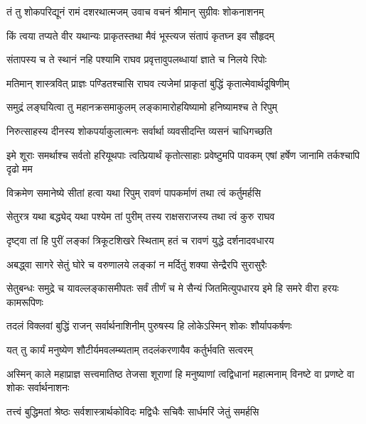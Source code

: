 
\twolineshloka
{तं तु शोकपरिद्यूनं रामं दशरथात्मजम्}
{उवाच वचनं श्रीमान् सुग्रीवः शोकनाशनम्} %

\twolineshloka
{किं त्वया तप्यते वीर यथान्यः प्राकृतस्तथा}
{मैवं भूस्त्यज संतापं कृतघ्न इव सौहृदम्} %

\twolineshloka
{संतापस्य च ते स्थानं नहि पश्यामि राघव}
{प्रवृत्तावुपलब्धायां ज्ञाते च निलये रिपोः} %

\twolineshloka
{मतिमान् शास्त्रवित् प्राज्ञः पण्डितश्चासि राघव}
{त्यजेमां प्राकृतां बुद्धिं कृतात्मेवार्थदूषिणीम्} %

\twolineshloka
{समुद्रं लङ्घयित्वा तु महानक्रसमाकुलम्}
{लङ्कामारोहयिष्यामो हनिष्यामश्च ते रिपुम्} %

\twolineshloka
{निरुत्साहस्य दीनस्य शोकपर्याकुलात्मनः}
{सर्वार्था व्यवसीदन्ति व्यसनं चाधिगच्छति} %

\threelineshloka
{इमे शूराः समर्थाश्च सर्वतो हरियूथपाः}
{त्वत्प्रियार्थं कृतोत्साहाः प्रवेष्टुमपि पावकम्}
{एषां हर्षेण जानामि तर्कश्चापि दृढो मम} %

\twolineshloka
{विक्रमेण समानेष्ये सीतां हत्वा यथा रिपुम्}
{रावणं पापकर्माणं तथा त्वं कर्तुमर्हसि} %

\twolineshloka
{सेतुरत्र यथा बद्ध्येद् यथा पश्येम तां पुरीम्}
{तस्य राक्षसराजस्य तथा त्वं कुरु राघव} %

\twolineshloka
{दृष्ट्वा तां हि पुरीं लङ्कां त्रिकूटशिखरे स्थिताम्}
{हतं च रावणं युद्धे दर्शनादवधारय} %

\twolineshloka
{अबद्ध्वा सागरे सेतुं घोरे च वरुणालये}
{लङ्कां न मर्दितुं शक्या सेन्द्रैरपि सुरासुरैः} %

\threelineshloka
{सेतुबन्धः समुद्रे च यावल्लङ्कासमीपतः}
{सर्वं तीर्णं च मे सैन्यं जितमित्युपधारय}
{इमे हि समरे वीरा हरयः कामरूपिणः} %

\twolineshloka
{तदलं विक्लवां बुद्धिं राजन् सर्वार्थनाशिनीम्}
{पुरुषस्य हि लोकेऽस्मिन् शोकः शौर्यापकर्षणः} %

\twolineshloka
{यत् तु कार्यं मनुष्येण शौटीर्यमवलम्ब्यताम्}
{तदलंकरणायैव कर्तुर्भवति सत्वरम्} %

\threelineshloka
{अस्मिन् काले महाप्राज्ञ सत्त्वमातिष्ठ तेजसा}
{शूराणां हि मनुष्याणां त्वद्विधानां महात्मनाम्}
{विनष्टे वा प्रणष्टे वा शोकः सर्वार्थनाशनः} %

\twolineshloka
{तत्त्वं बुद्धिमतां श्रेष्ठः सर्वशास्त्रार्थकोविदः}
{मद्विधैः सचिवैः सार्धमरिं जेतुं समर्हसि} %

